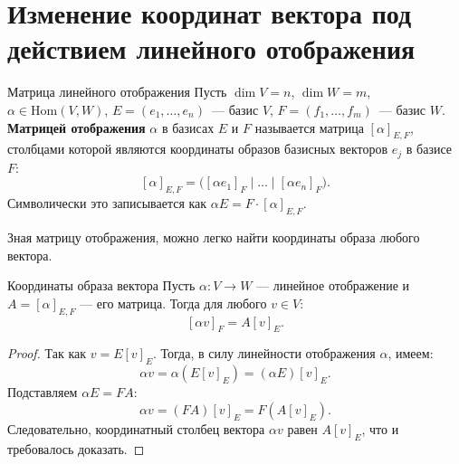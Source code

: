 
\section{Изменение координат вектора под действием линейного отображения}

\begin{Definition}{Матрица линейного отображения}{}
	Пусть $\dim V = n$, $\dim W = m$, $\alpha \in \mathrm{Hom}(V, W)$, $E = (e_1, \ldots, e_n)$~--- базис $V$, $F = (f_1, \ldots, f_m)$~--- базис $W$.
	\textbf{Матрицей отображения} $\alpha$ в базисах $E$ и $F$ называется матрица $[\alpha]_{E,F}$, столбцами которой являются координаты образов базисных векторов $e_j$ в базисе $F$:
	\[
	[\alpha]_{E,F} = \bigl([\alpha e_1]_F \;\Big|\; \ldots \;\Big|\; [\alpha e_n]_F\bigr).
	\]
	Символически это записывается как $\alpha E = F \cdot [\alpha]_{E,F}$.
\end{Definition}

Зная матрицу отображения, можно легко найти координаты образа любого вектора.

\begin{Statement}{Координаты образа вектора}{}
	Пусть $\alpha\colon V\to W$ --- линейное отображение и $A=[\alpha]_{E,F}$ --- его матрица. Тогда для любого $v\in V$:
	\[
	[\alpha v]_F = A[v]_E.
	\]
\end{Statement}

\begin{proof}
	Так как $v = E[v]_E$.
	Тогда, в силу линейности отображения $\alpha$, имеем:
	\[
	\alpha v = \alpha(E[v]_E) = (\alpha E)[v]_E.
	\]
	Подставляем $\alpha E = F A$:
	\[
	\alpha v = (FA)[v]_E = F(A[v]_E).
	\]
	 Следовательно, координатный столбец вектора $\alpha v$ равен $A[v]_E$, что и требовалось доказать.
\end{proof}
